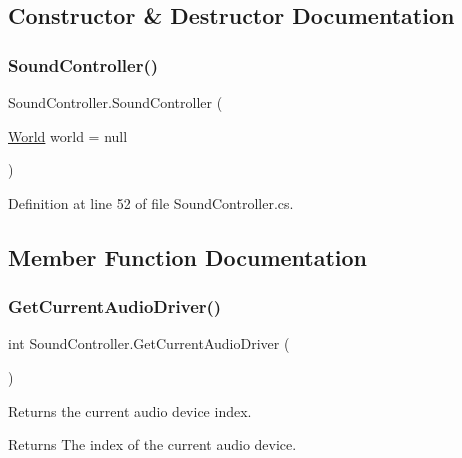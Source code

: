 \subsection{Constructor \& Destructor Documentation}
\mbox{\label{class_sound_controller_aaf08d95a3300fb4e53ea2c118f07f821}} 
\subsubsection{\texorpdfstring{Sound\+Controller()}{SoundController()}}
{\footnotesize\ttfamily Sound\+Controller.\+Sound\+Controller (\begin{DoxyParamCaption}\item[{\hyperlink{class_world}{World}}]{world = {\ttfamily null} }\end{DoxyParamCaption})}



Definition at line 52 of file Sound\+Controller.\+cs.



\subsection{Member Function Documentation}
\mbox{\label{class_sound_controller_a5722f7a6e1ae91b68d9b01a95ed4aef1}} 
\subsubsection{\texorpdfstring{Get\+Current\+Audio\+Driver()}{GetCurrentAudioDriver()}}
{\footnotesize\ttfamily int Sound\+Controller.\+Get\+Current\+Audio\+Driver (\begin{DoxyParamCaption}{ }\end{DoxyParamCaption})}



Returns the current audio device index. 

\begin{DoxyReturn}{Returns}
The index of the current audio device. 
\end{DoxyReturn}


